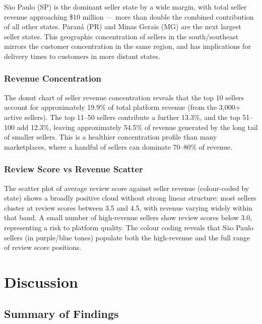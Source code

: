 \documentclass[12pt,a4paper]{article}
\begin{document}
São Paulo (SP) is the dominant seller state by a wide margin, with total seller revenue
approaching \$10 million — more than double the combined contribution of all other states.
Paraná (PR) and Minas Gerais (MG) are the next largest seller states. This geographic
concentration of sellers in the south/southeast mirrors the customer concentration in the
same region, and has implications for delivery times to customers in more distant states.

\subsubsection{Revenue Concentration}

The donut chart of seller revenue concentration reveals that the top 10 sellers account for
approximately 19.9\% of total platform revenue (from the 3,000+ active sellers). The top
11--50 sellers contribute a further 13.3\%, and the top 51--100 add 12.3\%, leaving
approximately 54.5\% of revenue generated by the long tail of smaller sellers. This is a
healthier concentration profile than many marketplaces, where a handful of sellers can
dominate 70--80\% of revenue.

\subsubsection{Review Score vs Revenue Scatter}

The scatter plot of average review score against seller revenue (colour-coded by state)
shows a broadly positive cloud without strong linear structure: most sellers cluster at
review scores between 3.5 and 4.5, with revenue varying widely within that band. A small
number of high-revenue sellers show review scores below 3.0, representing a risk to
platform quality. The colour coding reveals that São Paulo sellers (in purple/blue tones)
populate both the high-revenue and the full range of review score positions.

\section{Discussion}
\label{sec:discussion}

\subsection{Summary of Findings}
\end{document}
